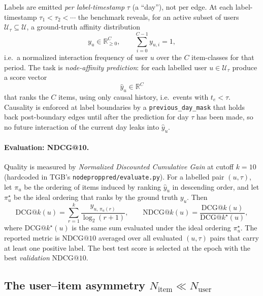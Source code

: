 \documentclass[11pt]{article}
\begin{document}
Labels are emitted \emph{per label-timestamp} $\tau$ (a ``day''), not per edge.
At each label-timestamp $\tau_1<\tau_2<\cdots$ the benchmark reveals, for an
active subset of users $\mathcal{U}_\tau\subseteq\mathcal{U}$, a ground-truth
affinity distribution
\begin{equation}
  y_u \in \mathbb{R}_{\ge 0}^{C}, \qquad \sum_{i=0}^{C-1} y_{u,i} = 1,
\end{equation}
i.e.\ a normalized interaction frequency of user $u$ over the $C$ item-classes
for that period. The task is \emph{node-affinity prediction}: for each labelled
user $u\in\mathcal{U}_\tau$ produce a score vector
\begin{equation}
  \hat{y}_u \in \mathbb{R}^{C}
\end{equation}
that ranks the $C$ items, using only causal history, i.e.\ events with
$t_e < \tau$. Causality is enforced at label boundaries by a
\texttt{previous\_day\_mask} that holds back post-boundary edges until after the
prediction for day $\tau$ has been made, so no future interaction of the current
day leaks into $\hat{y}_u$.

\paragraph{Evaluation: NDCG@10.}
Quality is measured by \emph{Normalized Discounted Cumulative Gain} at cutoff
$k=10$ (hardcoded in TGB's \texttt{nodeproppred/evaluate.py}). For a labelled
pair $(u,\tau)$, let $\pi_u$ be the ordering of items induced by ranking
$\hat{y}_u$ in descending order, and let $\pi^\star_u$ be the ideal ordering that
ranks by the ground truth $y_u$. Then
\begin{equation}
  \mathrm{DCG}@k(u) = \sum_{r=1}^{k}
    \frac{y_{u,\,\pi_u(r)}}{\log_2(r+1)}, \qquad
  \mathrm{NDCG}@k(u) =
    \frac{\mathrm{DCG}@k(u)}{\mathrm{DCG}@k^{\star}(u)},
\end{equation}
where $\mathrm{DCG}@k^{\star}(u)$ is the same sum evaluated under the ideal
ordering $\pi^\star_u$. The reported metric is $\mathrm{NDCG}@10$ averaged over
all evaluated $(u,\tau)$ pairs that carry at least one positive label. The
best test score is selected at the epoch with the best \emph{validation}
$\mathrm{NDCG}@10$.

\subsection{The user--item asymmetry $N_{\text{item}}\ll N_{\text{user}}$}
\end{document}

